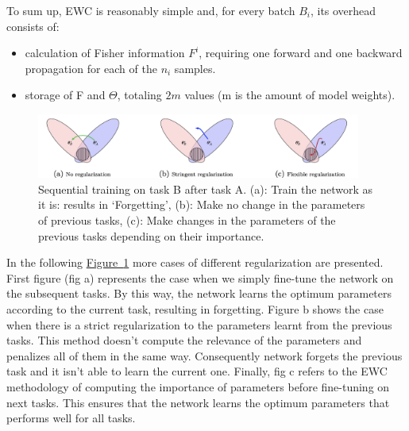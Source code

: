 \documentclass[english, LaM, oneside]{sapthesis}%
\begin{document}
To sum up, EWC is reasonably simple and, for every batch $B_i$, its overhead consists of:
\begin{itemize}
    \item calculation of Fisher information $F^i$, requiring one forward and one backward propagation for each of the $n_i$ samples.
    \item storage of F and $\Theta$, totaling $2m$ values (m is the amount of model weights).
   
\end{itemize}
\begin{figure}[h]
            \centering
            \includegraphics[width=0.95\textwidth]{ewc.png}
            \caption{Sequential training on task B after task A. (a): Train the network as it is: results in ‘Forgetting’, (b): Make no change in the parameters of previous tasks, (c): Make changes in the parameters of the previous tasks depending on their importance.}
            \label{fig:ewc}
        \end{figure}
In the following \hyperref[fig:ewc]{Figure~\ref*{fig:ewc}}  more cases of different regularization are presented. First figure (fig a) represents the case when we simply fine-tune the network on the subsequent tasks. By this way, the network learns the optimum parameters according to the current task, resulting in forgetting. Figure b shows the case when there is a strict regularization to the parameters learnt from the previous tasks. This method doesn’t compute the relevance of the parameters and penalizes all of them in the same way. Consequently network forgets the previous task and it isn't able to learn the current one. Finally, fig c refers to the EWC methodology of computing the importance of parameters before fine-tuning on next tasks. This ensures that the network learns the optimum parameters that performs well for all tasks.
\end{document}
